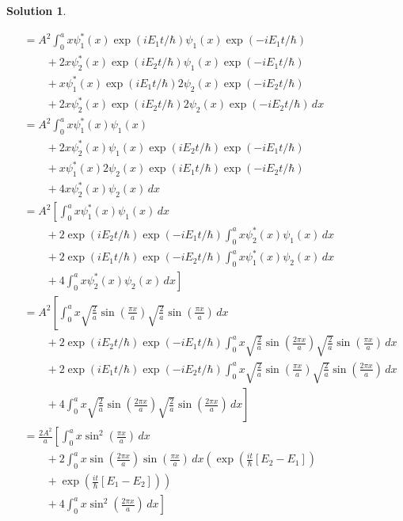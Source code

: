 \documentclass[10pt]{article}
\theoremstyle{definition}
\newtheorem{soln}{Solution}
\begin{document}
\begin{soln}
\begin{enumerate}[label=(\alph*)]
\begin{align*}
      &=A^2\int_{0}^{a}x\psi_1^*(x)\exp(iE_1t/\hbar)\psi_1(x)\exp(-iE_1t/\hbar)\\
      &\qquad+2x\psi_2^*(x)\exp(iE_2t/\hbar)\psi_1(x)\exp(-iE_1t/\hbar)\\
      &\qquad+x\psi_1^*(x)\exp(iE_1t/\hbar)2\psi_2(x)\exp(-iE_2t/\hbar)\\
      &\qquad+2x\psi_2^*(x)\exp(iE_2t/\hbar)2\psi_2(x)\exp(-iE_2t/\hbar)\,dx\\
      &=A^2\int_{0}^{a}x\psi_1^*(x)\psi_1(x)\\
      &\qquad+2x\psi_2^*(x)\psi_1(x)\exp(iE_2t/\hbar)\exp(-iE_1t/\hbar)\\
      &\qquad+x\psi_1^*(x)2\psi_2(x)\exp(iE_1t/\hbar)\exp(-iE_2t/\hbar)\\
      &\qquad+4x\psi_2^*(x)\psi_2(x)\,dx\\
      &=A^2\left[\int_{0}^{a}x\psi_1^*(x)\psi_1(x)\,dx\right.\\
      &\qquad+2\exp(iE_2t/\hbar)\exp(-iE_1t/\hbar)\int_{0}^{a}x\psi_2^*(x)\psi_1(x)\,dx\\
      &\qquad+2\exp(iE_1t/\hbar)\exp(-iE_2t/\hbar)\int_{0}^{a}x\psi_1^*(x)\psi_2(x)\,dx\\
      &\qquad+\left.4\int_{0}^{a}x\psi_2^*(x)\psi_2(x)\,dx\right]\\
      &=A^2\left[\int_{0}^{a}x\sqrt{\frac{2}{a}}\sin\left(\frac{\pi x}{a}\right)\sqrt{\frac{2}{a}}\sin\left(\frac{\pi x}{a}\right)\,dx\right.\\
      &\qquad+2\exp(iE_2t/\hbar)\exp(-iE_1t/\hbar)\int_{0}^{a}x\sqrt{\frac{2}{a}}\sin\left(\frac{2\pi x}{a}\right)\sqrt{\frac{2}{a}}\sin\left(\frac{\pi x}{a}\right)\,dx\\
      &\qquad+2\exp(iE_1t/\hbar)\exp(-iE_2t/\hbar)\int_{0}^{a}x\sqrt{\frac{2}{a}}\sin\left(\frac{\pi x}{a}\right)\sqrt{\frac{2}{a}}\sin\left(\frac{2\pi x}{a}\right)\,dx\\
      &\qquad+\left.4\int_{0}^{a}x\sqrt{\frac{2}{a}}\sin\left(\frac{2\pi x}{a}\right)\sqrt{\frac{2}{a}}\sin\left(\frac{2\pi x}{a}\right)\,dx\right]\\
      &=\frac{2A^2}{a}\left[\int_{0}^{a}x\sin^2\left(\frac{\pi x}{a}\right)\,dx\right.\\
      &\qquad+2\int_{0}^{a}x\sin\left(\frac{2\pi x}{a}\right)\sin\left(\frac{\pi x}{a}\right)\,dx\left(\exp(\frac{it}{\hbar}\left[E_2-E_1\right])\right.\\
      &\qquad+\left.\exp(\frac{it}{\hbar}\left[E_1-E_2\right])\right)\\
      &\qquad+\left.4\int_{0}^{a}x\sin^2\left(\frac{2\pi x}{a}\right)\,dx\right]\\

\end{align*}
\end{enumerate}
\end{soln}
\end{document}
